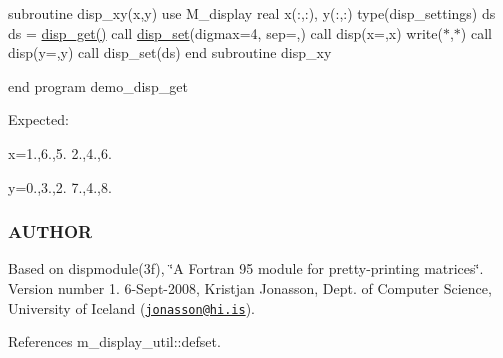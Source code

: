 subroutine disp\+\_\+xy(x,y) use M\+\_\+display real x(\+:,\+:), y(\+:,\+:) type(disp\+\_\+settings) ds ds = \hyperlink{namespacem__display_a6a49f987c37a95e67744950ecee69530}{disp\+\_\+get()} call \hyperlink{interfacem__display_1_1disp__set}{disp\+\_\+set}(digmax=4, sep=\textquotesingle{},\textquotesingle{}) call disp(\textquotesingle{}x=\textquotesingle{},x) write($\ast$,$\ast$) call disp(\textquotesingle{}y=\textquotesingle{},y) call disp\+\_\+set(ds) end subroutine disp\+\_\+xy

end program demo\+\_\+disp\+\_\+get

Expected\+:

x=1.,6.,5. 2.,4.,6.

y=0.,3.,2. 7.,4.,8.

\subsubsection*{A\+U\+T\+H\+OR}

Based on dispmodule(3f), \char`\"{}\+A Fortran 95 module for pretty-\/printing matrices\char`\"{}. Version number 1. 6-\/\+Sept-\/2008, Kristjan Jonasson, Dept. of Computer Science, University of Iceland (\href{mailto:jonasson@hi.is}{\tt jonasson@hi.\+is}). 

References m\+\_\+display\+\_\+util\+::defset.

\mbox{\label{namespacem__display_a0d50709ce2ad1894b93d80086584059a}} 
